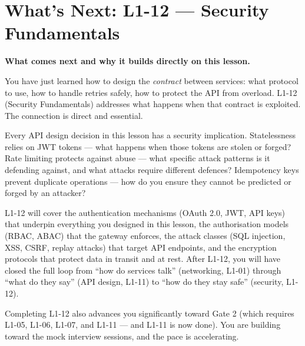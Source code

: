\documentclass[11pt,a4paper]{article}
\begin{document}
\newpage
\section{What's Next: L1-12 --- Security Fundamentals}

\begin{insightbox}
\textbf{What comes next and why it builds directly on this lesson.}

You have just learned how to design the \emph{contract} between services: what protocol to use, how to handle retries safely, how to protect the API from overload. L1-12 (Security Fundamentals) addresses what happens when that contract is exploited. The connection is direct and essential.

Every API design decision in this lesson has a security implication. Statelessness relies on JWT tokens --- what happens when those tokens are stolen or forged? Rate limiting protects against abuse --- what specific attack patterns is it defending against, and what attacks require different defences? Idempotency keys prevent duplicate operations --- how do you ensure they cannot be predicted or forged by an attacker?

L1-12 will cover the authentication mechanisms (OAuth 2.0, JWT, API keys) that underpin everything you designed in this lesson, the authorisation models (RBAC, ABAC) that the gateway enforces, the attack classes (SQL injection, XSS, CSRF, replay attacks) that target API endpoints, and the encryption protocols that protect data in transit and at rest. After L1-12, you will have closed the full loop from ``how do services talk'' (networking, L1-01) through ``what do they say'' (API design, L1-11) to ``how do they stay safe'' (security, L1-12).

Completing L1-12 also advances you significantly toward Gate 2 (which requires L1-05, L1-06, L1-07, and L1-11 --- and L1-11 is now done). You are building toward the mock interview sessions, and the pace is accelerating.
\end{insightbox}
\end{document}
